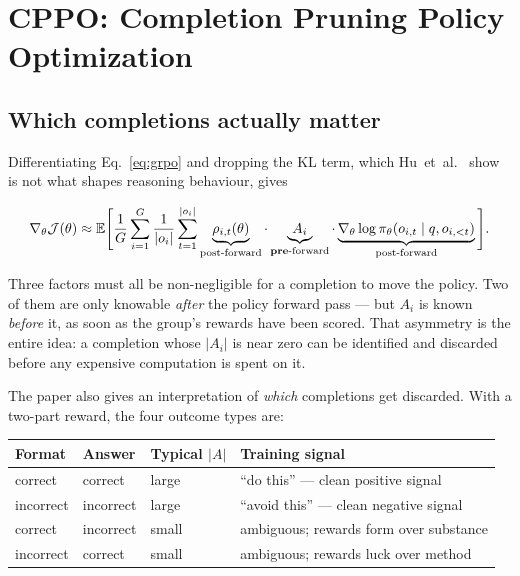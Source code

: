 \documentclass[11pt,a4paper]{article}
\newcommand{\Adv}{A}
\newcommand{\pol}{\pi_{\theta}}
\begin{document}
\section{CPPO: Completion Pruning Policy Optimization}
\label{sec:cppo}

\subsection{Which completions actually matter}

Differentiating Eq.~\eqref{eq:grpo} and dropping the KL term, which
Hu~et~al.~\cite{hu2025openreasonerzero} show is not what shapes reasoning
behaviour, gives

\begin{equation}
\label{eq:grad}
\nabla_\theta \mathcal{J}(\theta) \approx \mathbb{E}\Bigg[
\frac{1}{G}\sum_{i=1}^{G} \frac{1}{|o_i|} \sum_{t=1}^{|o_i|}
\underbrace{\rho_{i,t}(\theta)}_{\text{post-forward}} \cdot
\underbrace{\Adv_i}_{\text{\textbf{pre}-forward}} \cdot
\underbrace{\nabla_\theta \log \pol(o_{i,t} \mid q, o_{i,<t})}_{\text{post-forward}}
\Bigg].
\end{equation}

Three factors must all be non-negligible for a completion to move the policy.
Two of them are only knowable \emph{after} the policy forward pass --- but
$\Adv_i$ is known \emph{before} it, as soon as the group's rewards have been
scored. That asymmetry is the entire idea: a completion whose $|\Adv_i|$ is
near zero can be identified and discarded before any expensive computation is
spent on it.

The paper also gives an interpretation of \emph{which} completions get
discarded. With a two-part reward, the four outcome types are:

\begin{center}
\begin{tabular}{llll}
\toprule
Format & Answer & Typical $|\Adv|$ & Training signal \\
\midrule
correct   & correct   & large & ``do this'' --- clean positive signal \\
incorrect & incorrect & large & ``avoid this'' --- clean negative signal \\
correct   & incorrect & small & ambiguous; rewards form over substance \\
incorrect & correct   & small & ambiguous; rewards luck over method \\
\bottomrule
\end{tabular}
\end{center}
\end{document}
